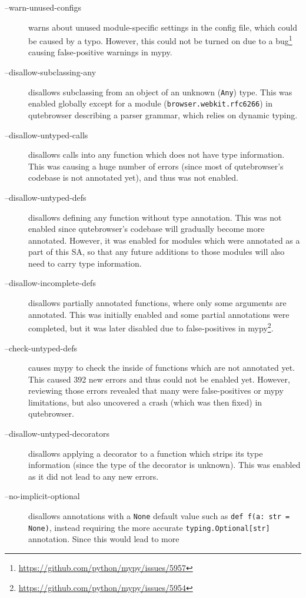 \documentclass[a4paper,parskip=full]{scrreprt}
\newcommand{\py}[1]{\texttt{#1}}
\begin{document}
\begin{description}
  \item[--warn-unused-configs] warns about unused module-specific settings in
    the config file, which could be caused by a typo. However, this could not be
    turned on due to a
    bug\footnote{\url{https://github.com/python/mypy/issues/5957}} causing
    false-positive warnings in mypy.
  \item[--disallow-subclassing-any] disallows subclassing from an object of an
    unknown (\verb|Any|) type. This was enabled globally except for a
    module (\verb|browser.webkit.rfc6266|) in qutebrowser describing a parser
    grammar, which relies on dynamic typing.
  \item[--disallow-untyped-calls] disallows calls into any function which does
    not have type information. This was causing a huge number of errors (since
    most of qutebrowser's codebase is not annotated yet), and thus was not
    enabled.
  \item[--disallow-untyped-defs] disallows defining any function without type
    annotation. This was not enabled since qutebrowser's codebase will gradually
    become more annotated. However, it was enabled for modules which were
    annotated as a part of this SA, so that any future additions to those
    modules will also need to carry type information.
  \item[--disallow-incomplete-defs] disallows partially annotated functions,
    where only some arguments are annotated. This was initially enabled and
    some partial annotations were completed, but it was later disabled due to
    false-positives in
    mypy\footnote{\url{https://github.com/python/mypy/issues/5954}}.
  \item[--check-untyped-defs] causes mypy to check the inside of functions which
    are not annotated yet. This caused 392 new errors and thus could not be
    enabled yet. However, reviewing those errors revealed that many were
    false-positives or mypy limitations, but also uncovered a crash (which was
    then fixed) in qutebrowser.
  \item[--disallow-untyped-decorators] disallows applying a decorator to a
    function which strips its type information (since the type of the decorator
    is unknown). This was enabled as it did not lead to any new errors.
  \item[--no-implicit-optional] disallows annotations with a \py{None} default
    value such as \py{def f(a: str = None)}, instead requiring the more
    accurate \py{typing.Optional[str]} annotation. Since this would lead to more

\end{description}
\end{document}
